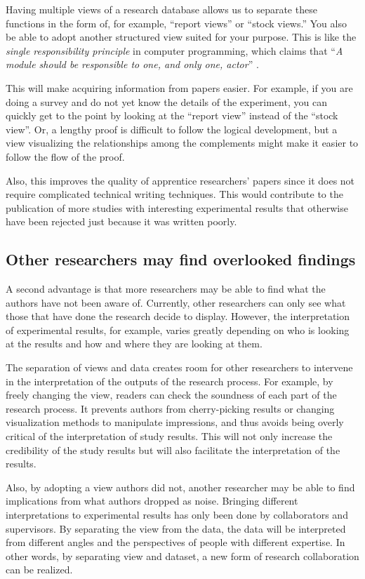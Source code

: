\documentclass{article}
\begin{document}
Having multiple views of a research database allows us to separate these functions in the form of, for example, ``report views'' or ``stock views.'' You also be able to adopt another structured view suited for your purpose. This is like the \textit{single responsibility principle} in computer programming, which claims that ``\textit{A module should be responsible to one, and only one, actor}'' \cite{martin2018clean}.

This will make acquiring information from papers easier. For example, if you are doing a survey and do not yet know the details of the experiment, you can quickly get to the point by looking at the ``report view'' instead of the ``stock view''. Or, a lengthy proof is difficult to follow the logical development, but a view visualizing the relationships among the complements might make it easier to follow the flow of the proof.

Also, this improves the quality of apprentice researchers’ papers since it does not require complicated technical writing techniques. This would contribute to the publication of more studies with interesting experimental results that otherwise have been rejected just because it was written poorly.

\subsection{Other researchers may find overlooked findings}
A second advantage is that more researchers may be able to find what the authors have not been aware of. Currently, other researchers can only see what those that have done the research decide to display. However, the interpretation of experimental results, for example, varies greatly depending on who is looking at the results and how and where they are looking at them.

The separation of views and data creates room for other researchers to intervene in the interpretation of the outputs of the research process. For example, by freely changing the view, readers can check the soundness of each part of the research process. It prevents authors from cherry-picking results or changing visualization methods to manipulate impressions, and thus avoids being overly critical of the interpretation of study results. This will not only increase the credibility of the study results but will also facilitate the interpretation of the results. 

Also, by adopting a view authors did not, another researcher may be able to find implications from what authors dropped as noise. Bringing different interpretations to experimental results has only been done by collaborators and supervisors. By separating the view from the data, the data will be interpreted from different angles and the perspectives of people with different expertise. In other words, by separating view and dataset, a new form of research collaboration can be realized.
\end{document}
